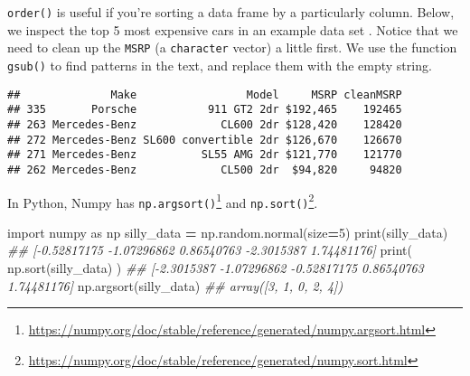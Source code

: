 \documentclass[12pt,krantz2]{krantz}
\makeatletter
\newenvironment{Shaded}{\begin{snugshade}}{\end{snugshade}}
\newcommand{\BuiltInTok}[1]{#1}
\newcommand{\CommentTok}[1]{\textcolor[rgb]{0.37,0.37,0.37}{\textit{#1}}}
\newcommand{\DataTypeTok}[1]{\textcolor[rgb]{0.27,0.27,0.27}{#1}}
\newcommand{\DecValTok}[1]{\textcolor[rgb]{0.06,0.06,0.06}{#1}}
\newcommand{\ImportTok}[1]{#1}
\newcommand{\KeywordTok}[1]{\textcolor[rgb]{0.27,0.27,0.27}{\textbf{#1}}}
\newcommand{\NormalTok}[1]{#1}
\newcommand{\OperatorTok}[1]{\textcolor[rgb]{0.43,0.43,0.43}{\textbf{#1}}}
\newcommand{\OtherTok}[1]{\textcolor[rgb]{0.37,0.37,0.37}{#1}}
\newcommand{\StringTok}[1]{\textcolor[rgb]{0.5,0.5,0.5}{#1}}
\renewcommand{\href}[2]{#2\footnote{\url{#1}}}
\newenvironment{kframe}{%
\medskip{}
\setlength{\fboxsep}{.8em}
 \def\at@end@of@kframe{}%
 \ifinner\ifhmode%
  \def\at@end@of@kframe{\end{minipage}}%
  \begin{minipage}{\columnwidth}%
 \fi\fi%
 \def\FrameCommand##1{\hskip\@totalleftmargin \hskip-\fboxsep
 \colorbox{shadecolor}{##1}\hskip-\fboxsep
     \hskip-\linewidth \hskip-\@totalleftmargin \hskip\columnwidth}%
 \MakeFramed {\advance\hsize-\width
   \@totalleftmargin\z@ \linewidth\hsize
   \@setminipage}}%
 {\par\unskip\endMakeFramed%
 \at@end@of@kframe}
\renewenvironment{Shaded}{\begin{kframe}}{\end{kframe}}
\makeatother
\begin{document}
\texttt{order()} is useful if you're sorting a data frame by a particularly column. Below, we inspect the top 5 most expensive cars in an example data set \citep{sas_cars}. Notice that we need to clean up the \texttt{MSRP} (a \texttt{character} vector) a little first. We use the function \texttt{gsub()} to find patterns in the text, and replace them with the empty string.

\begin{Shaded}
\end{Shaded}

\begin{verbatim}
##              Make                 Model     MSRP cleanMSRP
## 335       Porsche           911 GT2 2dr $192,465    192465
## 263 Mercedes-Benz             CL600 2dr $128,420    128420
## 272 Mercedes-Benz SL600 convertible 2dr $126,670    126670
## 271 Mercedes-Benz          SL55 AMG 2dr $121,770    121770
## 262 Mercedes-Benz             CL500 2dr  $94,820     94820
\end{verbatim}

In Python, Numpy has \href{https://numpy.org/doc/stable/reference/generated/numpy.argsort.html}{\texttt{np.argsort()}} and \href{https://numpy.org/doc/stable/reference/generated/numpy.sort.html}{\texttt{np.sort()}}.

\begin{Shaded}
\begin{Highlighting}[]
\ImportTok{import}\NormalTok{ numpy }\ImportTok{as}\NormalTok{ np}
\NormalTok{silly_data }\OperatorTok{=}\NormalTok{ np.random.normal(size}\OperatorTok{=}\DecValTok{5}\NormalTok{)}
\BuiltInTok{print}\NormalTok{(silly_data)}
\CommentTok{## [-0.52817175 -1.07296862  0.86540763 -2.3015387   1.74481176]}
\BuiltInTok{print}\NormalTok{( np.sort(silly_data) )}
\CommentTok{## [-2.3015387  -1.07296862 -0.52817175  0.86540763  1.74481176]}
\NormalTok{np.argsort(silly_data)}
\CommentTok{## array([3, 1, 0, 2, 4])}
\end{Highlighting}
\end{Shaded}
\end{document}
